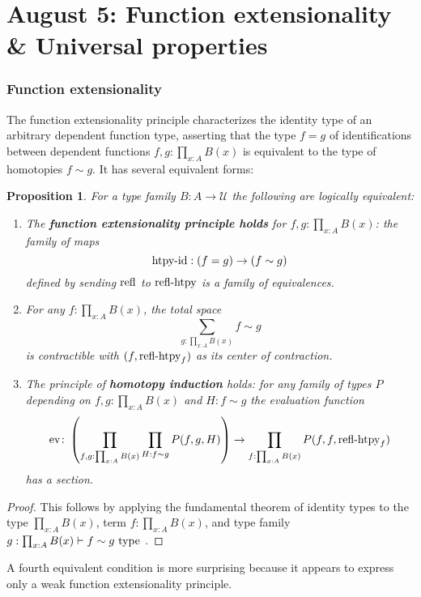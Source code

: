 \documentclass{amsart}
\theoremstyle{theorem}
\newtheorem*{prop}{Proposition}
\theoremstyle{definition}
\theoremstyle{remark}
\newcommand{\0}{\mathbbe{0}}
\newcommand{\1}{\mathbbe{1}}
\newcommand{\2}{\mathbbe{2}}
\newcommand{\3}{\mathbbe{3}}
\newcommand{\4}{\mathbbe{4}}
\newcommand{\univ}{{~\textup{type}~}}
\newcommand{\term}[1]{{\textup{#1}}}
\newcommand{\refl}{\term{refl}}
\newcommand{\UU}{{\mathcal{U}}}
\newcommand{\ev}{\term{ev}}
\begin{document}
\part*{August 5: Function extensionality \& Universal properties}


\section*{Function extensionality}

The function extensionality principle characterizes the identity type of an arbitrary dependent function type, asserting that the type $f=g$ of identifications between dependent functions $f,g : \prod_{x:A} B(x)$ is equivalent to the type of homotopies $f \sim g$. It has several equivalent forms:

\begin{prop} For a type family $B : A \to \UU$ the following are logically equivalent:
\begin{enumerate}
\item The \textbf{function extensionality principle holds} for $f,g : \prod_{x:A}B(x)$: the family of maps
\[ \term{htpy-id} : (f=g) \to (f \sim g)\]
defined by sending $\refl$ to $\term{refl-htpy}$ is a family of equivalences.
\item For any $f : \prod_{x:A}B(x)$, the total space
\[ \sum_{g : \prod_{x:A}B(x)} f \sim g\]
is contractible with $(f, \term{refl-htpy}_f)$ as its center of contraction.
\item The principle of \textbf{homotopy induction} holds: for any family of types $P$ depending on $f,g : \prod_{x:A}B(x)$ and $H : f \sim g$ the evaluation function
\[ \ev\colon \left( \prod_{f,g : \prod_{x:A}B(x)} \prod_{H : f \sim g} P(f,g,H) \right) \to \prod_{f : \prod_{x:A}B(x)} P(f,f, \term{refl-htpy}_f)\]
has a section.
\end{enumerate}
\end{prop}
\begin{proof}
This follows by applying the fundamental theorem of identity types to the type $\prod_{x:A}B(x)$, term $f : \prod_{x:A}B(x)$, and type family $g : \prod_{x:A}B(x) \vdash f \sim g \univ$.
\end{proof}

A fourth equivalent condition is more surprising because it appears to express only a weak function extensionality principle.
\end{document}
